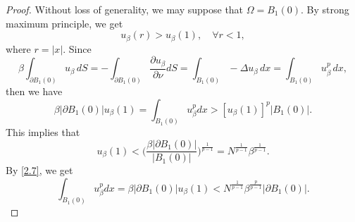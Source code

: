 \documentclass[12pt,reqno]{amsart}
\numberwithin{equation}{section}
\theoremstyle{definition}
\begin{document}
\begin{proof}
Without loss of generality, we may suppose that $\Omega=B_{1}(0)$. By strong maximum principle, we get 
\begin{equation*}
u_\beta(r)>u_\beta(1),\quad \forall r<1,
\end{equation*}
where $r=|x|$. Since 
\begin{equation}
\beta\int_{\partial B_1(0)}u_\beta\, dS
=-\int_{\partial B_1(0)}\frac{\partial u_\beta}{\partial\nu}dS
=\int_{B_1(0)}-\Delta u_\beta\, dx
=\int_{B_1(0)}u_\beta^p\, dx,
\end{equation}
then we have 
$$
\beta |\partial B_1(0)|u_\beta(1)=\int_{B_1(0)}u_\beta^pdx>[u_\beta(1)]^p| B_1(0)|.
$$
This implies that 
$$
u_\beta(1)<\Big( \frac{\beta |\partial B_1(0)|}{| B_1(0)|}\Big)^{\frac{1}{p-1}}=N^{\frac{1}{p-1}}\beta^{\frac{1}{p-1}}.
$$
By \eqref{2.7}, we get 
\begin{equation}\label{2.8}
\int_{B_1(0)}u_\beta^pdx=\beta |\partial B_1(0)|u_\beta(1)<N^{\frac{1}{p-1}}\beta^{\frac{p}{p-1}}|\partial B_1(0)|.
\end{equation}


\end{proof}
\end{document}
